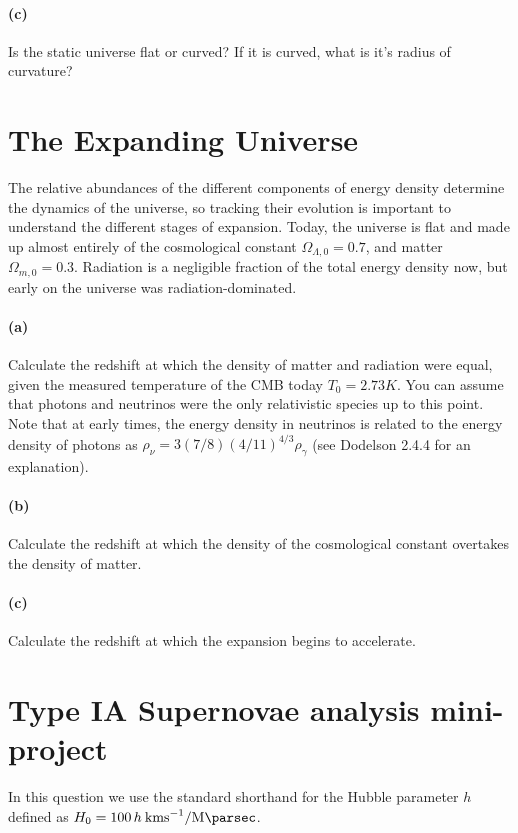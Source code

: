 \documentclass[12pt]{article}
\begin{document}
\paragraph{(c)} Is the static universe flat or curved? If it is curved, what is
it's radius of curvature?


\section{The Expanding Universe}

The relative abundances of the different components of energy density determine
the dynamics of the universe, so tracking their evolution is important to
understand the different stages of expansion. Today, the universe is flat and
made up almost entirely of the cosmological constant $\Omega_{\Lambda, 0} =
0.7$, and matter $\Omega_{m,0} = 0.3$. Radiation is a negligible fraction of the
total energy density now, but early on the universe was radiation-dominated.

\paragraph{(a)} Calculate the redshift at which the density of matter and
radiation were equal, given the measured temperature of the CMB today $T_0 =
2.73 K$. You can assume that photons and neutrinos were the only relativistic
species up to this point. Note that at early times, the energy density in
neutrinos is related to the energy density of photons as $\rho_\nu = 3 (7/8)
(4/11)^{4/3} \rho_\gamma$ (see Dodelson 2.4.4 for an explanation).

\paragraph{(b)} Calculate the redshift at which the density of the cosmological
constant overtakes the density of matter.

\paragraph{(c)} Calculate the redshift at which the expansion begins to
accelerate.

\section{Type IA Supernovae analysis mini-project}

In this question we use the standard shorthand for the Hubble parameter $h$ defined as $H_0 = 100\,h\:\si{\kilo\metre\second^{-1}\per\mega\parsec}$.
\end{document}
